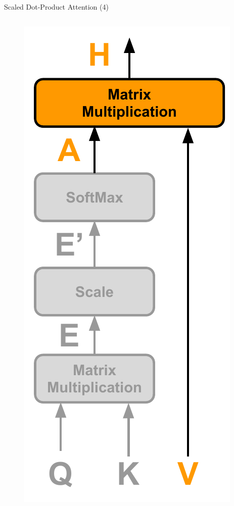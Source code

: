 \documentclass[10pt]{beamer}
\begin{document}
\begin{frame}[fragile]{Scaled Dot-Product Attention (4)}
    \begin{columns}
        \begin{figure}
            \centering
            \includegraphics[width=\textwidth]{figures/model/attention_step4.pdf}
        \end{figure}


\end{columns}
\end{frame}
\end{document}
